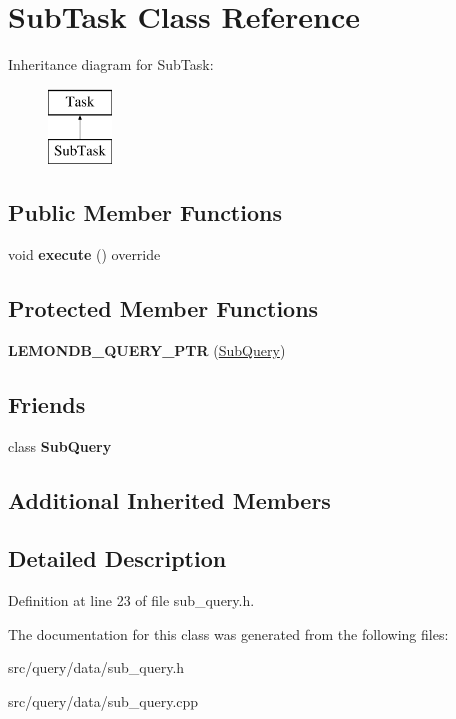 \hypertarget{class_sub_task}{}\section{Sub\+Task Class Reference}
\label{class_sub_task}
Inheritance diagram for Sub\+Task\+:\begin{figure}[H]
\begin{center}
\leavevmode
\includegraphics[height=2.000000cm]{class_sub_task}
\end{center}
\end{figure}
\subsection*{Public Member Functions}
\begin{DoxyCompactItemize}
\item 
\mbox{\label{class_sub_task_a44a895086552289bb7d9908e4b84d667}} 
void {\bfseries execute} () override
\end{DoxyCompactItemize}
\subsection*{Protected Member Functions}
\begin{DoxyCompactItemize}
\item 
\mbox{\label{class_sub_task_aca474662ed1f263e888cf0465e235395}} 
{\bfseries L\+E\+M\+O\+N\+D\+B\+\_\+\+Q\+U\+E\+R\+Y\+\_\+\+P\+TR} (\hyperlink{class_sub_query}{Sub\+Query})
\end{DoxyCompactItemize}
\subsection*{Friends}
\begin{DoxyCompactItemize}
\item 
\mbox{\label{class_sub_task_adf6a6118fa63fe11409653e2f0a156c9}} 
class {\bfseries Sub\+Query}
\end{DoxyCompactItemize}
\subsection*{Additional Inherited Members}


\subsection{Detailed Description}


Definition at line 23 of file sub\+\_\+query.\+h.



The documentation for this class was generated from the following files\+:\begin{DoxyCompactItemize}
\item 
src/query/data/sub\+\_\+query.\+h\item 
src/query/data/sub\+\_\+query.\+cpp\end{DoxyCompactItemize}
